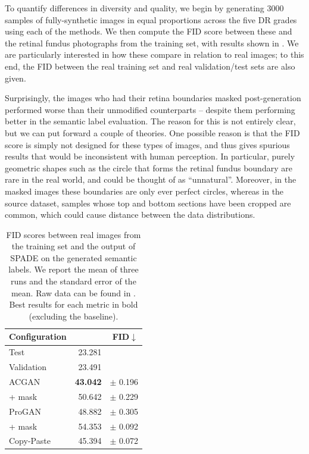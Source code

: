 To quantify differences in diversity and quality, we begin by generating 3000 samples of fully-synthetic images in equal proportions across the five DR grades using each of the methods.
We then compute the FID score between these and the retinal fundus photographs from the training set, with results shown in . 
We are particularly interested in how these compare in relation to real images; to this end, the FID between the real training set and real validation/test sets are also given.

Surprisingly, the images who had their retina boundaries masked post-generation performed worse than their unmodified counterparts -- despite them performing better in the semantic label evaluation.
The reason for this is not entirely clear, but we can put forward a couple of theories.
One possible reason is that the FID score is simply not designed for these types of images, and thus gives spurious results that would be inconsistent with human perception.
In particular, purely geometric shapes such as the circle that forms the retinal fundus boundary are rare in the real world, and could be thought of as ``unnatural''.
Moreover, in the masked images these boundaries are only ever perfect circles, whereas in the source dataset, samples whose top and bottom sections have been cropped are common, which could cause distance between the data distributions.

\begin{table}[h]
    \centering
    \begin{tabular}{lrr}
        \toprule
        Configuration & \multicolumn{2}{r}{FID$\downarrow$} \\
        \midrule
        Test & 23.281 & \\
        Validation & 23.491 & \\
        \midrule
        ACGAN & \textbf{43.042} & $\pm$ 0.196 \\
        + mask & 50.642 & $\pm$ 0.229 \\
        \midrule
        ProGAN & 48.882 & $\pm$ 0.305 \\
        + mask & 54.353 & $\pm$ 0.092 \\
        \midrule
        Copy-Paste & 45.394 & $\pm$ 0.072 \\
        \bottomrule
    \end{tabular}
    \caption{FID scores between real images from the training set and the output of SPADE on the generated semantic labels. We report the mean of three runs and the standard error of the mean. Raw data can be found in . Best results for each metric in bold (excluding the baseline).}
    \label{tab:spade_generated}
\end{table}

